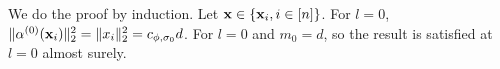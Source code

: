 %


 We do the proof by induction. Let $\mathbf{x} \in \{\mathbf{x}_i, i \in [n]\}$. For $l=0$, $\| \alpha^{(0)}(\mathbf{x}_i) \|_2^2 = \| x_i \|_2^2 =  c_{\phi,\sigma_0} d$.  For $l=0$ and $m_0 = d$, so the result is satisfied at $l=0$ almost surely.

